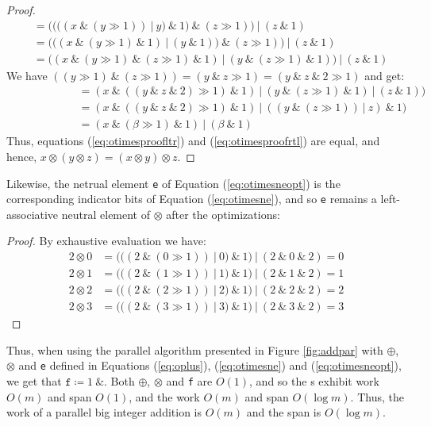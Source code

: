 \begin{proof}
\begin{align}
               &= ((((x~\&~(y \gg 1))~|~y)~\&~1)~\&~(z \gg 1))~|~(z~\&~1) \\
               &= (((x~\&~(y \gg 1)~\&~1)~|~(y~\&~1))~\&~(z \gg 1))~|~(z~\&~1) \\
               &= ((x~\&~(y \gg 1)~\&~(z \gg 1)~\&~1)~|~(y~\&~(z \gg 1)~\&~1))~|~(z~\&~1)
\end{align}
We have $((y \gg 1)~\&~(z \gg 1)) = (y~\&~z \gg 1) = (y~\&~z~\&~2 \gg 1)$ and get:
\begin{align}
  &= (x~\&~((y~\&~z~\&~2) \gg 1)~\&~1)~|~(y~\&~(z \gg 1)~\&~1)~|~(z~\&~1))\\
  \phantom{((\alpha~\&~1)\&}&= (x~\&~((y~\&~z~\&~2) \gg 1)~\&~1)~|~((y~\&~(z \gg 1))~|~z)~\&~1)\\
  &= (x~\&~(\beta \gg 1)~\&~1)~|~(\beta~\&~1)
\end{align}
Thus, equations (\ref{eq:otimesproofltr}) and (\ref{eq:otimesproofrtl}) are equal, and hence, $x \otimes (y \otimes z) = (x \otimes y) \otimes z$.
\end{proof}

Likewise, the netrual element \texttt{e} of Equation (\ref{eq:otimesneopt}) is
the corresponding indicator bits of Equation (\ref{eq:otimesne}), and so
\texttt{e} remains a left-associative neutral element of $\otimes$ after the
optimizations:

\begin{proof} By exhaustive evaluation we have:
\begin{align}
  \label{eq:otimesneproof}
  2 \otimes 0 &= (((2~\&~(0 \gg 1))~|~0)~\&~1)~|~(2~\&~0~\&~2) = 0 \\
  2 \otimes 1 &= (((2~\&~(1 \gg 1))~|~1)~\&~1)~|~(2~\&~1~\&~2) = 1 \\
  2 \otimes 2 &= (((2~\&~(2 \gg 1))~|~2)~\&~1)~|~(2~\&~2~\&~2) = 2 \\
  2 \otimes 3 &= (((2~\&~(3 \gg 1))~|~3)~\&~1)~|~(2~\&~3~\&~2) = 3
\end{align}
\end{proof}

Thus, when using the parallel algorithm presented in Figure \ref{fig:addpar}
with $\oplus$, $\otimes$ and \texttt{e} defined in Equations (\ref{eq:oplus}),
(\ref{eq:otimesne}) and (\ref{eq:otimesneopt}), we get that
$\mathtt{f} \coloneq 1~\&$. Both $\oplus$, $\otimes$ and \texttt{f} are $O(1)$, and so the
s exhibit work $O(m)$ and span $O(1)$, and the  work $O(m)$
and span $O(\log m)$. Thus, the work of a parallel big integer addition is
$O(m)$ and the span is $O(\log m)$.


